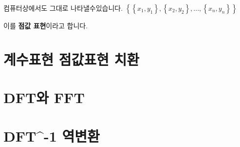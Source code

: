 컴퓨터상에서도 그대로 나타낼수있습니다.
$\left\{\left\{x_1, y_1\right\},\left\{x_2, y_2\right\}, ... ,\left\{x_n, y_n\right\}\right\}$

이를 \textbf{점값 표현}이라고 합니다.




\section{계수표현 점값표현 치환}



\section{DFT와 FFT}




\section{DFT^{-1} 역변환}
